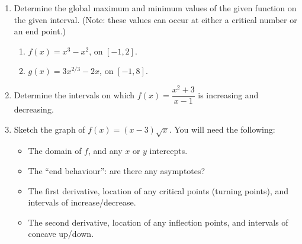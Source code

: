 \documentclass[12pt]{article}
\begin{document}
\begin{enumerate}
\item Determine the global maximum and minimum values of the given function on the given interval. (Note: these values can occur at either a critical number or an end point.)
\begin{enumerate}
\item $f(x)=x^3-x^2$, on $[-1,2]$.

\vspace{2.5in}

\item $g(x) = 3x^{2/3}-2x$, on $[-1,8]$.

\vspace{2.5in}


\end{enumerate}

\item  Determine the intervals on which $f(x) = \dfrac{x^2+3}{x-1}$ is increasing and decreasing.

\newpage

\item Sketch the graph of $f(x) = (x-3)\sqrt{x}$. You will need the following:

\begin{itemize}
\item The domain of $f$, and any $x$ or $y$ intercepts.
\item The ``end behaviour'': are there any asymptotes?
\item The first derivative, location of any critical points (turning points), and intervals of increase/decrease.
\item The second derivative, location of any inflection points, and intervals of concave up/down.
\end{itemize}

\newpage



\end{enumerate}
\end{document}
